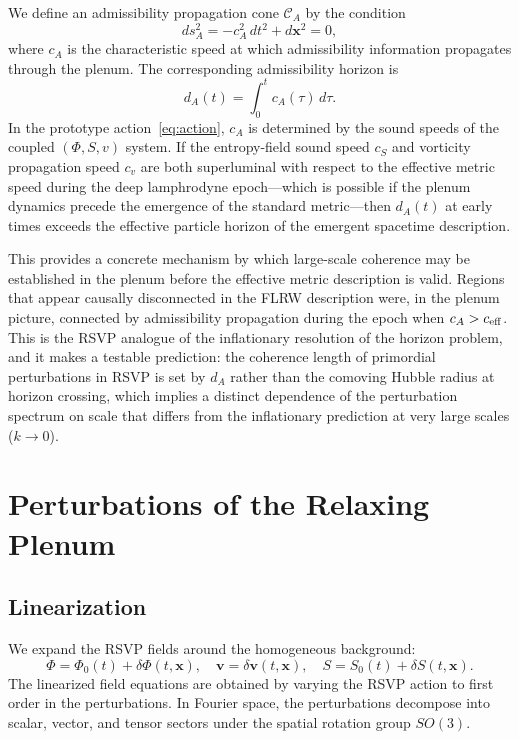\documentclass[12pt, a4paper]{article}
\newcommand{\vv}{\mathbf{v}}
\begin{document}
We define an admissibility propagation cone $\mathcal{C}_A$ by the condition
\begin{equation}
ds_A^2 = -c_A^2\,dt^2 + d\mathbf{x}^2 = 0,
\label{eq:admissibility_cone}
\end{equation}
where $c_A$ is the characteristic speed at which admissibility information
propagates through the plenum. The corresponding admissibility horizon is
\begin{equation}
d_A(t) = \int_0^t c_A(\tau)\,d\tau.
\label{eq:admissibility_horizon}
\end{equation}
In the prototype action~\eqref{eq:action}, $c_A$ is determined by the sound speeds
of the coupled $(\Phi, S, v)$ system. If the entropy-field sound speed $c_S$ and
vorticity propagation speed $c_v$ are both superluminal with respect to the
effective metric speed during the deep lamphrodyne epoch---which is possible if the
plenum dynamics precede the emergence of the standard metric---then $d_A(t)$ at
early times exceeds the effective particle horizon of the emergent spacetime
description.

This provides a concrete mechanism by which large-scale coherence may be established
in the plenum before the effective metric description is valid. Regions that appear
causally disconnected in the FLRW description were, in the plenum picture,
connected by admissibility propagation during the epoch when $c_A > c_{\rm eff}$.
This is the RSVP analogue of the inflationary resolution of the horizon problem,
and it makes a testable prediction: the coherence length of primordial perturbations
in RSVP is set by $d_A$ rather than the comoving Hubble radius at horizon crossing,
which implies a distinct dependence of the perturbation spectrum on scale that
differs from the inflationary prediction at very large scales ($k \to 0$).

\section{Perturbations of the Relaxing Plenum}
\label{sec:perturbations}

\subsection{Linearization}

We expand the RSVP fields around the homogeneous background:
\begin{equation}
\Phi = \Phi_0(t) + \delta\Phi(t, \mathbf{x}), \quad
\vv = \delta\vv(t, \mathbf{x}), \quad
S = S_0(t) + \delta S(t, \mathbf{x}).
\end{equation}
The linearized field equations are obtained by varying the RSVP action to first
order in the perturbations. In Fourier space, the perturbations decompose into
scalar, vector, and tensor sectors under the spatial rotation group $SO(3)$.
\end{document}
